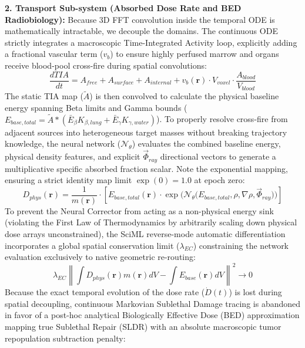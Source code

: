 \documentclass[11pt,a4paper]{article}
\begin{document}
\textbf{2. Transport Sub-system (Absorbed Dose Rate and BED Radiobiology):}
Because 3D FFT convolution inside the temporal ODE is mathematically intractable, we decouple the domains. The continuous ODE strictly integrates a macroscopic Time-Integrated Activity loop, explicitly adding a fractional vascular term ($v_b$) to ensure highly perfused marrow and organs receive blood-pool cross-fire during spatial convolutions:
\begin{equation}
    \frac{dTIA}{dt} = A_{free} + A_{surface} + A_{internal} + v_b(\mathbf{r}) \cdot V_{voxel} \cdot \frac{A_{blood}}{V_{blood}}
\end{equation}
The static TIA map ($\tilde{A}$) is then convolved to calculate the physical baseline energy spanning Beta limits and Gamma bounds ($E_{base, total} = \tilde{A} \ast (\bar{E}_\beta K_{\beta, lung} + \bar{E}_\gamma K_{\gamma, water})$). To properly resolve cross-fire from adjacent sources into heterogeneous target masses without breaking trajectory knowledge, the neural network ($\mathcal{N}_\theta$) evaluates the combined baseline energy, physical density features, and explicit $\vec{\Phi}_{ray}$ directional vectors to generate a multiplicative specific absorbed fraction scalar. Note the exponential mapping, ensuring a strict identity map limit $\exp(0)=1.0$ at epoch zero:
\begin{equation}
    D_{phys}(\mathbf{r}) = \frac{1}{m(\mathbf{r})} \cdot \left[ E_{base,total}(\mathbf{r}) \cdot \exp \Big(\mathcal{N}_\theta \big(E_{base,total}, \rho, \nabla \rho, \vec{\Phi}_{ray} \big)\Big) \right]
\end{equation}
To prevent the Neural Corrector from acting as a non-physical energy sink (violating the First Law of Thermodynamics by arbitrarily scaling down physical dose arrays unconstrained), the SciML reverse-mode automatic differentiation incorporates a global spatial conservation limit ($\lambda_{EC}$) constraining the network evaluation exclusively to native geometric re-routing:
\begin{equation}
    \lambda_{EC} \left\| \int D_{phys}(\mathbf{r}) m(\mathbf{r}) dV - \int E_{base}(\mathbf{r}) dV \right\|^2 \to 0
\end{equation}
Because the exact temporal evolution of the dose rate ($\dot{D}(t)$) is lost during spatial decoupling, continuous Markovian Sublethal Damage tracing is abandoned in favor of a post-hoc analytical Biologically Effective Dose (BED) approximation mapping true Sublethal Repair (SLDR) with an absolute macroscopic tumor repopulation subtraction penalty:
\end{document}
